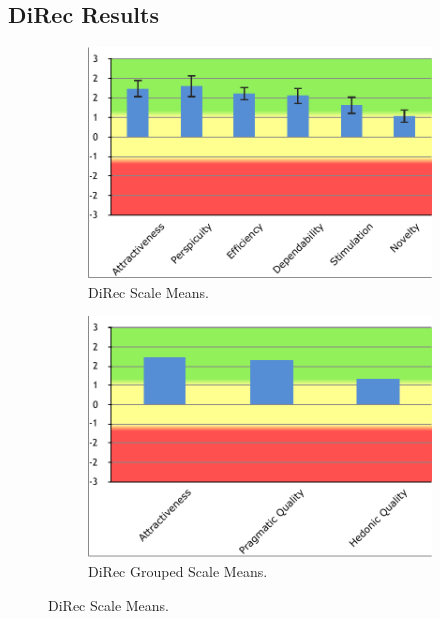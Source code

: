 \subsection{DiRec Results}

\begin{figure}
\centering
\begin{subfigure}[b]{0.5\textwidth}
\includegraphics[width=\textwidth]{figures/direc-results}
\caption{DiRec Scale Means.}
\label{fig:figure16b}
\end{subfigure}
\begin{subfigure}[b]{0.5\textwidth}
\includegraphics[width=\textwidth]{figures/direc-results2}
\caption{DiRec Grouped Scale Means.}
\label{fig:figure516a}
\end{subfigure}
\caption{DiRec Scale Means.}
\label{fig:figure516}
\end{figure}

